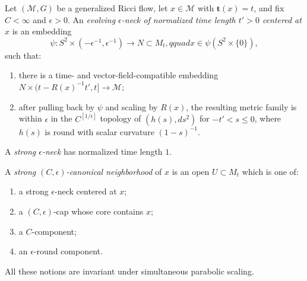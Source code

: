 \begin{definition}\label{def:strong-epsilon-neck-canonical-neighborhood}
\label{defncanonnbhd}
Let $(\mathcal M,G)$ be a generalized Ricci flow, let
$x\in\mathcal M$ with $\mathbf t(x)=t$, and fix $C<\infty$ and
$\epsilon>0$. An \emph{evolving $\epsilon$-neck of normalized time
length $t'>0$ centered at $x$} is an embedding
\[
 \psi:S^2\times(-\epsilon^{-1},\epsilon^{-1})\longrightarrow
 N\subset M_t,qquad x\in\psi(S^2\times\{0\}),
\]
such that:
\begin{enumerate}
\item[(1)] there is a time- and vector-field-compatible embedding
$N\times(t-R(x)^{-1}t',t]\to\mathcal M$;
\item[(2)] after pulling back by $\psi$ and scaling by $R(x)$, the
resulting metric family is within $\epsilon$ in the
$C^{[1/\epsilon]}$ topology of
$(h(s),ds^2)$ for $-t'<s\leq0$, where $h(s)$ is round with scalar
curvature $(1-s)^{-1}$.
\end{enumerate}
A \emph{strong $\epsilon$-neck} has normalized time length $1$.

A \emph{strong $(C,\epsilon)$-canonical neighborhood} of $x$ is an
open $U\subset M_t$ which is one of:
\begin{enumerate}
\item[(1)] a strong $\epsilon$-neck centered at $x$;
\item[(2)] a $(C,\epsilon)$-cap whose core contains $x$;
\item[(3)] a $C$-component;
\item[(4)] an $\epsilon$-round component.
\end{enumerate}
All these notions are invariant under simultaneous parabolic
scaling.
\end{definition}

